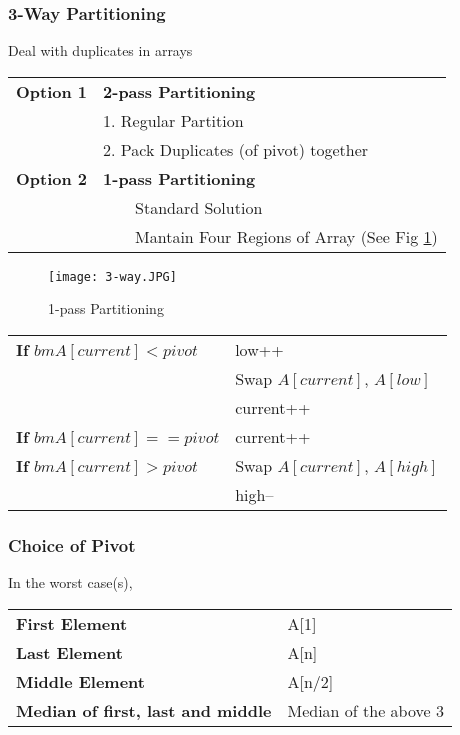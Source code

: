 \documentclass{article}
\newcommand{\tabitem}{~~\llap{\textbullet}~~}
\begin{document}
    \pagebreak

    \subsubsection{3-Way Partitioning}

    Deal with duplicates in arrays

    \begin{tabular}{ll}
        \textbf{Option 1} & \textbf{2-pass Partitioning}\\
        & 1. Regular Partition\\
        & 2. Pack Duplicates (of pivot) together\\
        \textbf{Option 2} & \textbf{1-pass Partitioning}\\
        & \tabitem Standard Solution\\
        & \tabitem Mantain Four Regions of Array (See Fig \ref{1pass})\\
    \end{tabular}

    \begin{figure}[htbp]
        \begin{center}
        \texttt{[image: 3-way.JPG]}
        \caption{1-pass Partitioning}
        \label{1pass}
        \end{center}
    \end{figure}

    \begin{tabular}{ll}
        \textbf{ If }$bm{A[current] < pivot}$ & low++\\
        & Swap $A[current]$, $A[low]$\\
        & current++\\
        \textbf{ If} $bm{A[current] == pivot}$ & current++\\
        \textbf{ If} $bm{A[current] > pivot}$ & Swap $A[current]$, $A[high]$ \\
        & high--\\
    \end{tabular}

    \subsubsection{Choice of Pivot}
    In the worst case(s),
    
    \noindent\begin{tabular}{ll}
        \textbf{First Element} & A[1]\\
        \textbf{Last Element} & A[n]\\
        \textbf{Middle Element} & A[n/2]\\
        \textbf{Median of first, last and middle} & Median of the above 3\\
    \end{tabular}
    
\end{document}
